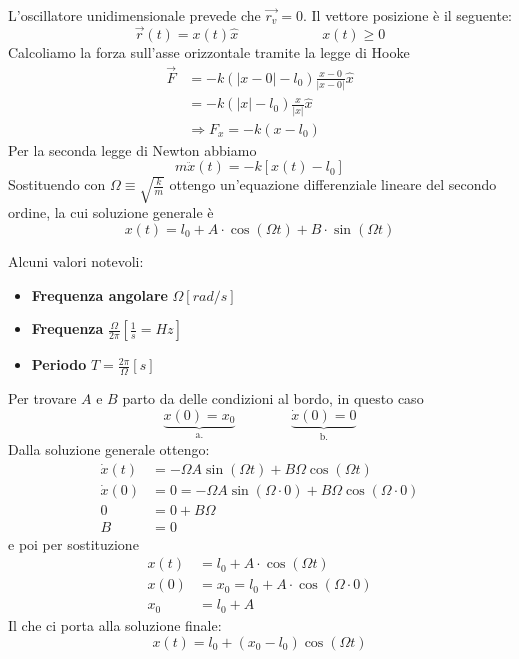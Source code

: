 \begin{example}
	L'oscillatore unidimensionale prevede che $\vec{r_v}=0$. Il vettore posizione è il seguente:
	\begin{equation*}
		\vec{r}(t) = x(t) \widehat{x} \qquad\qquad\qquad x(t) \geq 0
	\end{equation*}
	Calcoliamo la forza sull'asse orizzontale tramite la legge di Hooke
	\begin{align*}
		\vec{F} & = -k (\lvert x-0\rvert - l_0) \frac{x-0}{\lvert x - 0 \rvert}\widehat{x} \\
		& = -k  (\lvert x \rvert - l_0) \frac{x}{\lvert x \rvert}\widehat{x} \\
		& \Rightarrow F_x = -k (x-l_0)
	\end{align*}
	Per la seconda legge di Newton abbiamo
	\begin{equation*}
		m \ddot{x}(t) = -k[x(t)-l_0]
	\end{equation*}
	Sostituendo con $\Omega \equiv \sqrt{\frac{k}{m}}$ ottengo un'equazione differenziale lineare del secondo ordine, la cui soluzione generale è
	\begin{equation*}
		x(t) = l_0 + A \cdot \cos(\Omega t) + B \cdot \sin(\Omega t)
	\end{equation*}
	
	\begin{note}
		Alcuni valori notevoli:
		\begin{itemize}
			\item \textbf{Frequenza angolare} $\Omega [rad/s]$
			\item \textbf{Frequenza} $\frac{\Omega}{2\pi}[\frac{1}{s} = Hz]$
			\item \textbf{Periodo} $T = \frac{2\pi}{\Omega}[s]$
		\end{itemize}
	\end{note}
	
	Per trovare $A$ e $B$ parto da delle condizioni al bordo, in questo caso
	\begin{equation*}
		\underbrace{x(0) = x_0}_{\text{a.}} \qquad\qquad \underbrace{\dot{x}(0) = 0}_{\text{b.}}
	\end{equation*}
	Dalla soluzione generale ottengo:
	\begin{align*}
		\dot{x}(t) &= -\Omega A\sin(\Omega t) + B\Omega \cos(\Omega t) \\
		\dot{x}(0) & = 0 = -\Omega A \sin(\Omega \cdot 0) + B \Omega \cos (\Omega \cdot 0) \\
		0 & = 0 + B \Omega \\
		B & = 0
	\end{align*}
	e poi per sostituzione
	\begin{align*}
		x(t) & = l_0 + A \cdot \cos(\Omega t) \\
		x(0) & = x_0 = l_0 + A \cdot \cos(\Omega \cdot 0) \\
		x_0 & = l_0 + A
	\end{align*}
	Il che ci porta alla soluzione finale:
	\begin{equation*}
		x(t) = l_0 + (x_0-l_0)\cos(\Omega t)
	\end{equation*}
\end{example}

